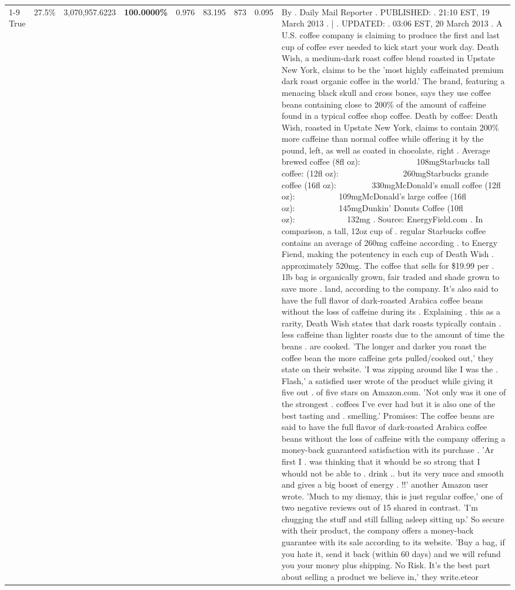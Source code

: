 \begin{table}[H]
{\begin{tabular}{lllrlllll}
\cline{1-9} \cline{2-9}
True & 27.5\% & 3,070,957.6223 & \bfseries \color{red} 100.0000\% & 0.976 & 83.195 & 873 & 0.095 & By . Daily Mail Reporter . PUBLISHED: . 21:10 EST, 19 March 2013 . | . UPDATED: . 03:06 EST, 20 March 2013 . A U.S. coffee company is claiming to produce the first and last cup of coffee ever needed to kick start your work day. Death Wish, a medium-dark roast coffee blend roasted in Upstate New York, claims to be the 'most highly caffeinated premium dark roast organic coffee in the world.' The brand, featuring a menacing black skull and cross bones, says they use coffee beans containing close to 200\% of the amount of caffeine found in a typical coffee shop coffee. Death by coffee: Death Wish, roasted in Upstate New York, claims to contain 200\% more caffeine than normal coffee while offering it by the pound, left, as well as coated in chocolate, right . Average brewed coffee (8fl oz):              108mgStarbucks tall coffee: (12fl oz):                260mgStarbucks grande coffee (16fl oz):         330mgMcDonald's small coffee (12fl oz):           109mgMcDonald's large coffee (16fl oz):           145mgDunkin' Donuts Coffee (10fl oz):             132mg . Source: EnergyField.com . In comparison, a tall, 12oz cup of . regular Starbucks coffee contains an average of 260mg caffeine according . to Energy Fiend, making the potentency in each cup of Death Wish . approximately 520mg. The coffee that sells for \$19.99 per . 1lb bag is organically grown, fair traded and shade grown to save more . land, according to the company. It's also said to have the full flavor of dark-roasted Arabica coffee beans without the loss of caffeine during its . Explaining . this as a rarity, Death Wish states that dark roasts typically contain . less caffeine than lighter roasts due to the amount of time the beans . are cooked. 'The longer and darker you roast the coffee bean the more caffeine gets pulled/cooked out,' they state on their website. 'I was zipping around like I was the . Flash,' a satisfied user wrote of the product while giving it five out . of five stars on Amazon.com. 'Not only was it one of the strongest . coffees I've ever had but it is also one of the best tasting and . smelling.’ Promises: The coffee beans are said to have the full flavor of dark-roasted Arabica coffee beans without the loss of caffeine with the company offering a money-back guaranteed satisfaction with its purchase . 'Ar first I . was thinking that it whould be so strong that I whould not be able to . drink .. but its very nuce and smooth and gives a big boost of energy . !!' another Amazon user wrote. 'Much to my dismay, this is just regular coffee,' one of two negative reviews out of 15 shared in contrast. 'I'm chugging the stuff and still falling asleep sitting up.' So secure with their product, the company offers a money-back guarantee with its sale according to its website. 'Buy a bag, if you hate it, send it back (within 60 days) and we will refund you your money plus shipping. No Risk. It’s the best part about selling a product we believe in,' they write.eteor \\

\end{tabular}}
\end{table}
